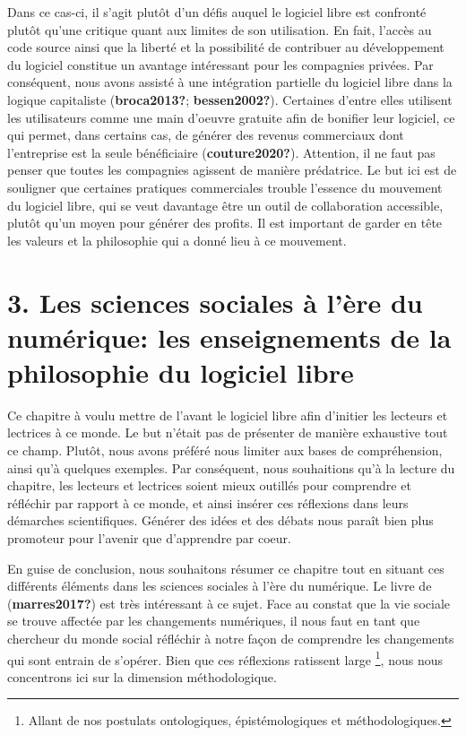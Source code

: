 \documentclass[
  letterpaper,
]{scrbook}
\begin{document}
Dans ce cas-ci, il s'agit plutôt d'un défis auquel le logiciel libre est
confronté plutôt qu'une critique quant aux limites de son utilisation.
En fait, l'accès au code source ainsi que la liberté et la possibilité
de contribuer au développement du logiciel constitue un avantage
intéressant pour les compagnies privées. Par conséquent, nous avons
assisté à une intégration partielle du logiciel libre dans la logique
capitaliste (\textbf{broca2013?}; \textbf{bessen2002?}). Certaines
d'entre elles utilisent les utilisateurs comme une main d'oeuvre
gratuite afin de bonifier leur logiciel, ce qui permet, dans certains
cas, de générer des revenus commerciaux dont l'entreprise est la seule
bénéficiaire (\textbf{couture2020?}). Attention, il ne faut pas penser
que toutes les compagnies agissent de manière prédatrice. Le but ici est
de souligner que certaines pratiques commerciales trouble l'essence du
mouvement du logiciel libre, qui se veut davantage être un outil de
collaboration accessible, plutôt qu'un moyen pour générer des profits.
Il est important de garder en tête les valeurs et la philosophie qui a
donné lieu à ce mouvement.

\hypertarget{les-sciences-sociales-uxe0-luxe8re-du-numuxe9rique-les-enseignements-de-la-philosophie-du-logiciel-libre}{%
\section{3. Les sciences sociales à l'ère du numérique: les
enseignements de la philosophie du logiciel
libre}\label{les-sciences-sociales-uxe0-luxe8re-du-numuxe9rique-les-enseignements-de-la-philosophie-du-logiciel-libre}}

Ce chapitre à voulu mettre de l'avant le logiciel libre afin d'initier
les lecteurs et lectrices à ce monde. Le but n'était pas de présenter de
manière exhaustive tout ce champ. Plutôt, nous avons préféré nous
limiter aux bases de compréhension, ainsi qu'à quelques exemples. Par
conséquent, nous souhaitions qu'à la lecture du chapitre, les lecteurs
et lectrices soient mieux outillés pour comprendre et réfléchir par
rapport à ce monde, et ainsi insérer ces réflexions dans leurs démarches
scientifiques. Générer des idées et des débats nous paraît bien plus
promoteur pour l'avenir que d'apprendre par coeur.

En guise de conclusion, nous souhaitons résumer ce chapitre tout en
situant ces différents éléments dans les sciences sociales à l'ère du
numérique. Le livre de (\textbf{marres2017?}) est très intéressant à ce
sujet. Face au constat que la vie sociale se trouve affectée par les
changements numériques, il nous faut en tant que chercheur du monde
social réfléchir à notre façon de comprendre les changements qui sont
entrain de s'opérer. Bien que ces réflexions ratissent large
\footnote{Allant de nos postulats ontologiques, épistémologiques et
  méthodologiques.}, nous nous concentrons ici sur la dimension
méthodologique.
\end{document}
